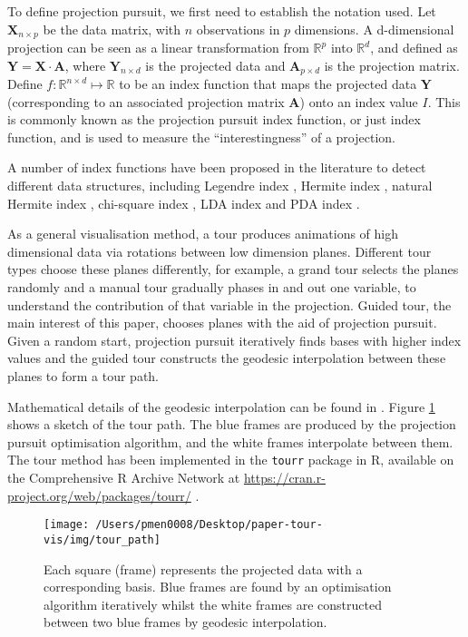 \documentclass[12pt]{article}
\begin{document}
To define projection pursuit, we first need to establish the notation used. Let \(\mathbf{X}_{n \times p}\) be the data matrix, with \(n\) observations in \(p\) dimensions. A d-dimensional projection can be seen as a linear transformation from \(\mathbb{R}^p\) into \(\mathbb{R}^d\), and defined as \(\mathbf{Y} = \mathbf{X} \cdot \mathbf{A}\), where \(\mathbf{Y}_{n \times d}\) is the projected data and \(\mathbf{A}_{p\times d}\) is the projection matrix. Define \(f: \mathbb{R}^{n \times d} \mapsto \mathbb{R}\) to be an index function that maps the projected data \(\mathbf{Y}\) (corresponding to an associated projection matrix \(\mathbf{A}\)) onto an index value \(I\). This is commonly known as the projection pursuit index function, or just index function, and is used to measure the ``interestingness'' of a projection.

A number of index functions have been proposed in the literature to detect different data structures, including Legendre index \citep{friedman1974projection}, Hermite index \citep{hall1989polynomial}, natural Hermite index \citep{cook1993projection}, chi-square index \citep{posse1995projection}, LDA index \citep{lee2005projection} and PDA index \citep{lee2010projection}.

As a general visualisation method, a tour produces animations of high dimensional data via rotations between low dimension planes. Different tour types choose these planes differently, for example, a grand tour \citep{cook2008grand} selects the planes randomly and a manual tour \citep{cook1997manual} gradually phases in and out one variable, to understand the contribution of that variable in the projection. Guided tour, the main interest of this paper, chooses planes with the aid of projection pursuit. Given a random start, projection pursuit iteratively finds bases with higher index values and the guided tour constructs the geodesic interpolation between these planes to form a tour path.

Mathematical details of the geodesic interpolation can be found in \citet{buja2005computational}. Figure \ref{fig:tour-path} shows a sketch of the tour path. The blue frames are produced by the projection pursuit optimisation algorithm, and the white frames interpolate between them. The tour method has been implemented in the \texttt{tourr} package in R, available on the Comprehensive R Archive Network at \url{https://cran.r-project.org/web/packages/tourr/} \citep{wickham2011tourrpackage}.

\begin{figure}

{\centering \texttt{[image: /Users/pmen0008/Desktop/paper-tour-vis/img/tour\_path]} 

}

\caption{Each square (frame) represents the projected data with a corresponding basis. Blue frames are found by an optimisation algorithm iteratively whilst the white frames are constructed between two blue frames by geodesic interpolation.}\label{fig:tour-path}
\end{figure}
\end{document}
